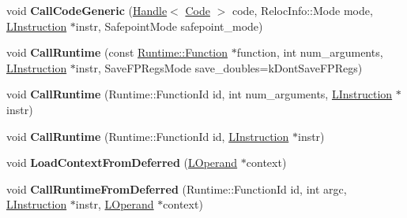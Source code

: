 \begin{DoxyCompactItemize}
\item 
void {\bfseries Call\+Code\+Generic} (\hyperlink{classv8_1_1internal_1_1_handle}{Handle}$<$ \hyperlink{classv8_1_1internal_1_1_code}{Code} $>$ code, Reloc\+Info\+::\+Mode mode, \hyperlink{classv8_1_1internal_1_1_l_instruction}{L\+Instruction} $\ast$instr, Safepoint\+Mode safepoint\+\_\+mode)\hypertarget{classv8_1_1internal_1_1_l_code_gen_a902e149712841134b7a31a866542b477}{}\label{classv8_1_1internal_1_1_l_code_gen_a902e149712841134b7a31a866542b477}

\item 
void {\bfseries Call\+Runtime} (const \hyperlink{structv8_1_1internal_1_1_runtime_1_1_function}{Runtime\+::\+Function} $\ast$function, int num\+\_\+arguments, \hyperlink{classv8_1_1internal_1_1_l_instruction}{L\+Instruction} $\ast$instr, Save\+F\+P\+Regs\+Mode save\+\_\+doubles=k\+Dont\+Save\+F\+P\+Regs)\hypertarget{classv8_1_1internal_1_1_l_code_gen_ac9553032ed88d8b7b9a408c04124781f}{}\label{classv8_1_1internal_1_1_l_code_gen_ac9553032ed88d8b7b9a408c04124781f}

\item 
void {\bfseries Call\+Runtime} (Runtime\+::\+Function\+Id id, int num\+\_\+arguments, \hyperlink{classv8_1_1internal_1_1_l_instruction}{L\+Instruction} $\ast$instr)\hypertarget{classv8_1_1internal_1_1_l_code_gen_ac16bd03d079fe227358121f48075b4b7}{}\label{classv8_1_1internal_1_1_l_code_gen_ac16bd03d079fe227358121f48075b4b7}

\item 
void {\bfseries Call\+Runtime} (Runtime\+::\+Function\+Id id, \hyperlink{classv8_1_1internal_1_1_l_instruction}{L\+Instruction} $\ast$instr)\hypertarget{classv8_1_1internal_1_1_l_code_gen_a5a8eebd32428c2f6904e2875a4dbbb18}{}\label{classv8_1_1internal_1_1_l_code_gen_a5a8eebd32428c2f6904e2875a4dbbb18}

\item 
void {\bfseries Load\+Context\+From\+Deferred} (\hyperlink{classv8_1_1internal_1_1_l_operand}{L\+Operand} $\ast$context)\hypertarget{classv8_1_1internal_1_1_l_code_gen_a9009104c76636c80f382e04c1dd304ca}{}\label{classv8_1_1internal_1_1_l_code_gen_a9009104c76636c80f382e04c1dd304ca}

\item 
void {\bfseries Call\+Runtime\+From\+Deferred} (Runtime\+::\+Function\+Id id, int argc, \hyperlink{classv8_1_1internal_1_1_l_instruction}{L\+Instruction} $\ast$instr, \hyperlink{classv8_1_1internal_1_1_l_operand}{L\+Operand} $\ast$context)\hypertarget{classv8_1_1internal_1_1_l_code_gen_a4c3be7c7de6a86615c912e70cfc04ab4}{}\label{classv8_1_1internal_1_1_l_code_gen_a4c3be7c7de6a86615c912e70cfc04ab4}


\end{DoxyCompactItemize}
